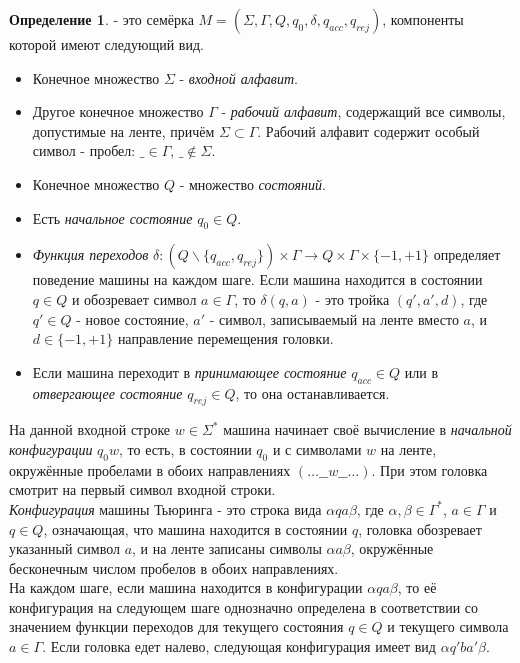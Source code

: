 \documentclass[a4paper]{article}
\theoremstyle{indented}
\theoremstyle{definition}
\newtheorem{defn}{Определение}
\theoremstyle{remark}
\DeclareMathOperator{\ra}{\rightarrow}
\begin{document}
\begin{defn}
     - это семёрка $M = (\Sigma,\Gamma,Q,q_0,\delta,q_{acc},q_{rej})$, компоненты которой имеют следующий вид.

    \begin{itemize}
        \item Конечное множество $\Sigma$ - \textit{входной алфавит}.
        \item Другое конечное множество $\Gamma$ - \textit{рабочий алфавит}, содержащий все символы, допустимые на ленте, причём $\Sigma \subset \Gamma$. Рабочий алфавит содержит особый символ - пробел: $\_ \in \Gamma$, $\_ \notin \Sigma$.
        \item Конечное множество $Q$ - множество \textit{состояний}.
        \item Есть \textit{начальное состояние} $q_0 \in Q$.
        \item \textit{Функция переходов} $\delta: (Q\backslash \{q_{acc},q_{rej}\})\times \Gamma \ra Q \times \Gamma \times \{-1,+1\}$ определяет поведение машины на каждом шаге. Если машина находится в состоянии $q \in Q$ и обозревает символ $a \in \Gamma$, то $\delta(q,a)$ - это тройка $(q',a',d)$, где $q' \in Q$ - новое состояние, $a'$ - символ, записываемый на ленте вместо $a$, и $d \in \{-1, +1\}$ направление перемещения головки.
        \item Если машина переходит в \textit{принимающее состояние} $q_{acc} \in Q$ или в \textit{отвергающее состояние} $q_{rej} \in Q$, то она останавливается.
    \end{itemize}

    На данной входной строке $w \in \Sigma^*$ машина начинает своё вычисление в \textit{начальной конфигурации} $q_0w$, то есть, в состоянии $q_0$ и с символами $w$ на ленте, окружённые пробелами в обоих направлениях $(\ldots \_ \_ w \_ \_ \ldots)$. При этом головка смотрит на первый символ входной строки. \\ 

    \textit{Конфигурация} машины Тьюринга - это строка вида $ \alpha q a \beta$, где $\alpha, \beta \in \Gamma^*$, $a \in \Gamma$ и $q \in Q$, означающая, что машина находится в состоянии $q$, головка обозревает указанный символ $a$, и на ленте записаны символы $\alpha a \beta$, окружённые бесконечным числом пробелов в обоих направлениях. \\ 

    На каждом шаге, если машина находится в конфигурации $ \alpha q a \beta$, то её конфигурация на следующем шаге однозначно определена в соответствии со значением функции переходов для текущего состояния $q \in Q$ и текущего символа $a \in \Gamma$. Если головка едет налево, следующая конфигурация имеет вид $\alpha q' b a' \beta$. \\ 


\end{defn}
\end{document}

